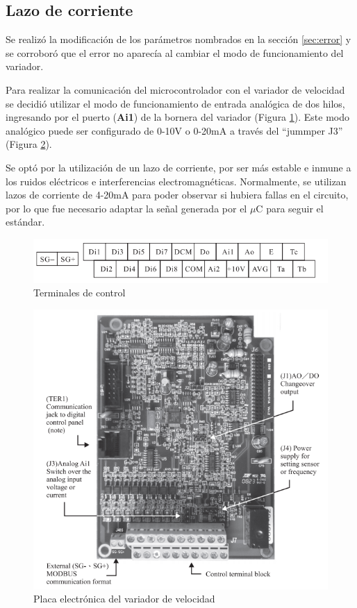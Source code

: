 \subsection{Lazo de corriente} \label{sec:lazoI}

Se realizó la modificación de los parámetros nombrados en la sección \ref{sec:error} y se corroboró que el error no aparecía al cambiar el modo de funcionamiento del variador.

Para realizar la comunicación del microcontrolador con el variador de velocidad se decidió utilizar el modo de funcionamiento de entrada analógica de dos hilos, ingresando por el puerto (\textbf{Ai1}) de la bornera del variador (Figura \ref{fig:born}). Este modo analógico puede ser configurado de 0-10V o 0-20mA a través del “jummper J3” (Figura \ref{fig:placals}).

Se optó por la utilización de un lazo de corriente, por ser más estable e inmune a los ruidos eléctricos e interferencias electromagnéticas. Normalmente, se utilizan lazos de corriente de 4-20mA para poder observar si hubiera fallas en el circuito, por lo que fue necesario adaptar la señal generada por el $\mu$C para seguir el estándar.



\begin{figure}[h]
	\centering
	\includegraphics[width=0.7\linewidth]{imagenes/terminales.png}
	\caption{Terminales de control}
	\label{fig:born}
\end{figure}

\begin{figure}[htbp]
	\centering
\includegraphics[width=0.7\linewidth]{imagenes/placa_ls}
\caption{Placa electrónica del variador de velocidad}
\label{fig:placals}
\end{figure}


